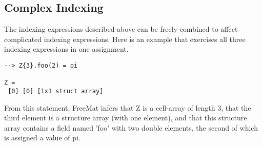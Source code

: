 \subsection{Complex Indexing}

The indexing expressions described above can be freely combined
to affect complicated indexing expressions.  Here is an example
that exercises all three indexing expressions in one assignment.
\begin{verbatim}
--> Z{3}.foo(2) = pi

Z = 
 [0] [0] [1x1 struct array] 
\end{verbatim}
From this statement, FreeMat infers that Z is a cell-array of 
length 3, that the third element is a structure array (with one
element), and that this structure array contains a field named
'foo' with two double elements, the second of which is assigned
a value of pi.
